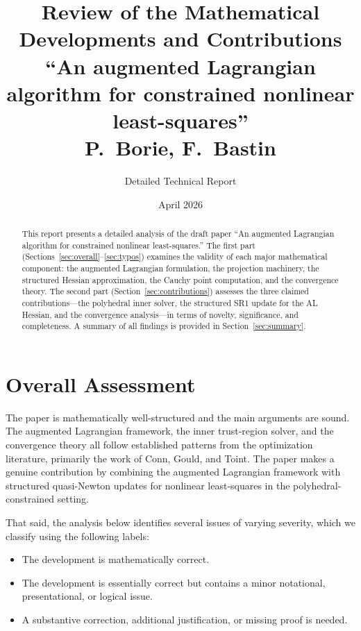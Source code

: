 \documentclass[11pt]{article}
\title{\textbf{Review of the Mathematical Developments and Contributions}\\[6pt]
\large ``An augmented Lagrangian algorithm for constrained nonlinear least-squares''\\[4pt]
\normalsize P.~Borie, F.~Bastin}
\author{Detailed Technical Report}
\date{April 2026}
\newcommand{\statusok}{\textcolor{okcolor}{\textbf{[Correct]}}}
\newcommand{\statuswarn}{\textcolor{warncolor}{\textbf{[Minor issue]}}}
\newcommand{\statuserr}{\textcolor{issuecolor}{\textbf{[Needs correction]}}}
\theoremstyle{plain}
\begin{document}
\maketitle
\thispagestyle{fancy}

\begin{abstract}
This report presents a detailed analysis of the draft paper ``An augmented Lagrangian algorithm for constrained nonlinear least-squares.'' The first part (Sections~\ref{sec:overall}--\ref{sec:typos}) examines the validity of each major mathematical component: the augmented Lagrangian formulation, the projection machinery, the structured Hessian approximation, the Cauchy point computation, and the convergence theory. The second part (Section~\ref{sec:contributions}) assesses the three claimed contributions---the polyhedral inner solver, the structured SR1 update for the AL Hessian, and the convergence analysis---in terms of novelty, significance, and completeness. A summary of all findings is provided in Section~\ref{sec:summary}.
\end{abstract}

\tableofcontents

\newpage

\section{Overall Assessment}\label{sec:overall}

The paper is mathematically well-structured and the main arguments are sound. The augmented Lagrangian framework, the inner trust-region solver, and the convergence theory all follow established patterns from the optimization literature, primarily the work of Conn, Gould, and Toint. The paper makes a genuine contribution by combining the augmented Lagrangian framework with structured quasi-Newton updates for nonlinear least-squares in the polyhedral-constrained setting.

That said, the analysis below identifies several issues of varying severity, which we classify using the following labels:
\begin{itemize}[leftmargin=2cm]
  \item[\statusok] The development is mathematically correct.
  \item[\statuswarn] The development is essentially correct but contains a minor notational, presentational, or logical issue.
  \item[\statuserr] A substantive correction, additional justification, or missing proof is needed.
\end{itemize}
\end{document}
